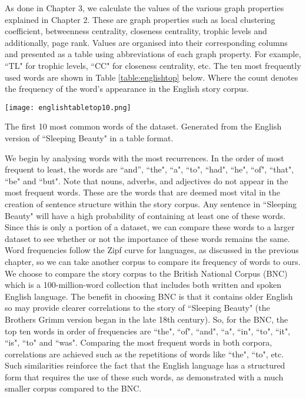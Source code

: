 As done in Chapter 3, we calculate the values of the various graph properties explained in Chapter 2. These are graph properties such as local clustering coefficient, betweenness centrality, closeness centrality, trophic levels and additionally, page rank. Values are organised into their corresponding columns and presented as a table using abbreviations of each graph property. For example, ``TL" for trophic levels, ``CC" for closeness centrality, etc. The ten most frequently used words are shown in Table \ref{table:englishtop} below. Where the count denotes the frequency of the word's appearance in the English story corpus. 

\begin{table}[!htb]
\centering
\texttt{[image: englishtabletop10.png]}
\caption{The first 10 most common words of the dataset. Generated from the English version of ``Sleeping Beauty" in a table format.}
\label{table:englishtop}
\end{table}

We begin by analysing words with the most recurrences. In the order of most frequent to least, the words are ``and'', ``the", ``a", ``to", ``had", ``he", ``of", ``that", ``be" and ``but". Note that nouns, adverbs, and adjectives do not appear in the most frequent words. These are the words that are deemed most vital in the creation of sentence structure within the story corpus. Any sentence in ``Sleeping Beauty" will have a high probability of containing at least one of these words. Since this is only a portion of a dataset, we can compare these words to a larger dataset to see whether or not the importance of these words remains the same. Word frequencies follow the Zipf curve for languages, as discussed in the previous chapter, so we can take another corpus to compare its frequency of words to ours. We choose to compare the story corpus to the British National Corpus (BNC) \cite{bnc2007british} which is a 100-million-word collection that includes both written and spoken English language. The benefit in choosing BNC is that it contains older English so may provide clearer correlations to the story of ``Sleeping Beauty" (the Brothers Grimm version began in the late 18th century). So, for the BNC, the top ten words \cite{leech2014word} in order of frequencies are ``the", ``of", ``and", ``a", ``in", ``to", ``it", ``is", ``to" and ``was". Comparing the most frequent words in both corpora, correlations are achieved such as the repetitions of words like ``the", ``to", etc. Such similarities reinforce the fact that the English language has a structured form that requires the use of these such words, as demonstrated with a much smaller corpus compared to the BNC.

